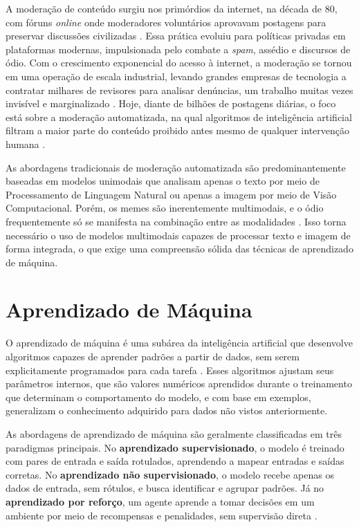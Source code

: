 A moderação de conteúdo surgiu nos primórdios da internet, na década de 80, com fóruns \textit{online} onde moderadores voluntários aprovavam postagens para preservar discussões civilizadas \cite{Ackermann2020}. Essa prática evoluiu para políticas privadas em plataformas modernas, impulsionada pelo combate a \textit{spam}, assédio e discursos de ódio. Com o crescimento exponencial do acesso à internet, a moderação se tornou em uma operação de escala industrial, levando grandes empresas de tecnologia a contratar milhares de revisores para analisar denúncias, um trabalho muitas vezes invisível e marginalizado \cite{gillespie2018, gray2019}. Hoje, diante de bilhões de postagens diárias, o foco está sobre a moderação automatizada, na qual algoritmos de inteligência artificial filtram a maior parte do conteúdo proibido antes mesmo de qualquer intervenção humana \cite{gillespie2020}.

As abordagens tradicionais de moderação automatizada são predominantemente baseadas em modelos unimodais que analisam apenas o texto por meio de Processamento de Linguagem Natural ou apenas a imagem por meio de Visão Computacional. Porém, os memes são inerentemente multimodais, e o ódio frequentemente só se manifesta na combinação entre as modalidades \cite{ArticleHatefulMemesChallenge2020}. Isso torna necessário o uso de modelos multimodais capazes de processar texto e imagem de forma integrada, o que exige uma compreensão sólida das técnicas de aprendizado de máquina.

\section{Aprendizado de Máquina}
 
O aprendizado de máquina é uma subárea da inteligência artificial que desenvolve algoritmos capazes de aprender padrões a partir de dados, sem serem explicitamente programados para cada tarefa \cite{samuel1959}. Esses algoritmos ajustam seus parâmetros internos, que são valores numéricos aprendidos durante o treinamento que determinam o comportamento do modelo, e com base em exemplos, generalizam o conhecimento adquirido para dados não vistos anteriormente.
 
As abordagens de aprendizado de máquina são geralmente classificadas em três paradigmas principais. No \textbf{aprendizado supervisionado}, o modelo é treinado com pares de entrada e saída rotulados, aprendendo a mapear entradas e saídas corretas. No \textbf{aprendizado não
supervisionado}, o modelo recebe apenas os dados de entrada, sem rótulos, e busca identificar e agrupar padrões. Já no \textbf{aprendizado por reforço}, um agente aprende a tomar decisões em um ambiente por meio de recompensas e penalidades, sem supervisão direta \cite{russell2020}.
 
